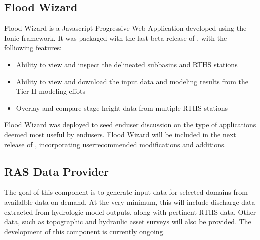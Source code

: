 \documentclass[letterpaper,12pt,english,openany,oneside]{sphinxmanual}
\begin{document}
\subsection{Flood Wizard}
\label{\detokenize{euidev/integrations/index:flood-wizard}}
\sphinxAtStartPar
Flood Wizard is a Javascript Progressive Web Application developed using the Ionic framework. It was packaged with the last beta release of {\hyperref[\detokenize{_static/glossary:term-RGVFlood}]{}}, with the folliowing features:
\begin{itemize}
\item {} 
\sphinxAtStartPar
Ability to view and inspect the {\hyperref[\detokenize{_static/glossary:term-RGVFlood}]{}} delineated sub\sphinxhyphen{}basins and RTHS stations

\item {} 
\sphinxAtStartPar
Ability to view and download the input data and modeling results from the Tier II modeling effots

\item {} 
\sphinxAtStartPar
Overlay and compare stage height data from multiple RTHS stations

\end{itemize}

\sphinxAtStartPar
Flood Wizard was deployed to seed end\sphinxhyphen{}user discussion on the type of applications deemed most useful by end\sphinxhyphen{}users. Flood Wizard will be  included in the next release of {\hyperref[\detokenize{_static/glossary:term-RGVFlood.com}]{}}, incorporating user\sphinxhyphen{}recommended modifications and additions.


\subsection{RAS Data Provider}
\label{\detokenize{euidev/integrations/index:ras-data-provider}}
\sphinxAtStartPar
The goal of this component is to generate  input data for selected domains from {\hyperref[\detokenize{_static/glossary:term-RGVFlood.com}]{}} availalble data on demand.  At the very minimum, this will include discharge data extracted from hydrologic model outputs, along with pertinent RTHS data. Other data, such as topographic and hydraulic asset surveys will also be provided. The development of this component is currently on\sphinxhyphen{}going.
\end{document}
